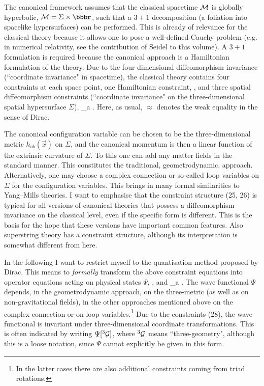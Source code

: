 The canonical framework assumes that the classical spacetime ${\cal M}$
is globally hyperbolic, ${\cal M}=\Sigma\times\bbbr$, such that 
a $3+1$ decomposition (a foliation into spacelike hypersurfaces)
can be performed. This is already of relevance for the
classical theory because it allows one to pose a well-defined
Cauchy problem (e.g. in numerical relativity, see the
contribution of Seidel to this volume). A $3+1$ formulation
is required because the canonical approach is a Hamiltonian
formulation of the theory.
 Due to the
four-dimensional diffeomorphism invariance (``coordinate
invariance" in spacetime), the classical
theory contains four constraints at each space point,
one Hamiltonian constraint,
 , \enspace \ee
and three spatial diffeomorphism constraints (``coordinate invariance"
on the three-dimensional spatial hypersurface $\Sigma$),
_a . \enspace \ee
Here, as usual, $\approx$ denotes the weak equality in the
sense of Dirac.

The canonical configuration variable can
be chosen to be the three-dimensional metric
$h_{ab}(\vec{x})$ on $\Sigma$, and the canonical momentum is then a linear
function of the extrinsic curvature of $\Sigma$. To this one can add
any matter fields in the standard manner. This constitutes the
traditional, geometrodynamic, approach. Alternatively, one may choose
a complex connection or so-called 
loop variables on $\Sigma$ for the configuration
variables. This brings in many formal similarities to
Yang--Mills theories. I want to emphasise that the constraint structure
(25, 26) is typical for all versions of canonical theories that possess a
diffeomorphism invariance on the classical level, even
if the specific form is different. This is the basis for the hope
that these versions have important common features.
Also superstring theory has a constraint structure, although
its interpretation is somewhat different from here.

In the following I want to restrict myself to the quantisation
method proposed by Dirac. This means to {\em formally} transform
the above constraint equations into operator equations acting
on physical states $\Psi$, 
\be {} \enspace , \ee
and
\be {}_a \enspace . \ee
The wave functional $\Psi$ depends, in the geometrodynamic approach,
on the three-metric (as well as on non-gravitational fields),
in the other approaches mentioned above on the complex connection
or on loop variables.\footnote{In the latter cases there are also
additional constraints coming from triad rotations.}
Due to the constraints (28), the wave functional is invariant under
three-dimensional coordinate transformations. This is often
indicated by writing $\Psi[^3{\cal G}]$, where $^3{\cal G}$ means
``three-geometry", although this is a loose notation, since $\Psi$
cannot explicitly be given in this form.
 
